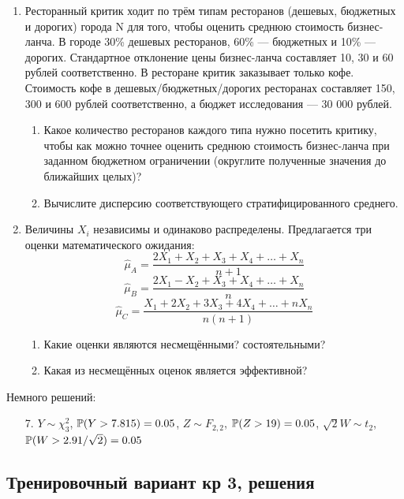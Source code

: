 \documentclass[12pt, a4paper]{article}\usepackage[]{graphicx}\usepackage[]{color}
\begin{document}
\begin{enumerate}
							\item Ресторанный критик ходит по трём типам ресторанов (дешевых, бюджетных и дорогих) города N для того, чтобы оценить среднюю стоимость бизнес-ланча. В городе 30\% дешевых ресторанов, 60\% — бюджетных и 10\% — дорогих. Стандартное отклонение цены бизнес-ланча составляет 10, 30 и 60 рублей соответственно. В ресторане критик заказывает только кофе. Стоимость кофе в дешевых/бюджетных/дорогих ресторанах составляет 150, 300 и 600 рублей соответственно, а бюджет исследования — 30 000 рублей.
							\begin{enumerate}
								\item Какое количество ресторанов каждого типа нужно посетить критику, чтобы как можно точнее оценить среднюю стоимость бизнес-ланча при заданном бюджетном ограничении (округлите полученные значения до ближайших целых)?
								\item  Вычислите дисперсию соответствующего стратифицированного среднего.
							\end{enumerate}



							\item Величины $X_i$ независимы и одинаково распределены. Предлагается три оценки математического ожидания:
							\[
							\hat \mu_A = \frac{2X_1 + X_2 + X_3 + X_4 +\ldots + X_n}{n+1}
							\]
							\[
							\hat \mu_B = \frac{2X_1 - X_2 + X_3 + X_4 + \ldots + X_n}{n}
							\]
							\[
							\hat \mu_C = \frac{X_1 + 2X_2 + 3X_3 + 4X_4 + \ldots + nX_n}{n(n+1)}
							\]

							\begin{enumerate}
								\item Какие оценки являются несмещёнными? состоятельными?
								\item Какая из несмещённых оценок является эффективной?
							\end{enumerate}
						\end{enumerate}

						Немного решений:

						\begin{enumerate}
							\item[7.] $Y \sim \chi^2_3$, $\P(Y>7.815)=0.05$, $Z \sim F_{2,2}$, $\P(Z>19)=0.05$, $\sqrt{2}W \sim t_{2}$, $\P(W > 2.91/\sqrt{2})=0.05$
						\end{enumerate}


						\subsection{Тренировочный вариант кр 3, решения}
\end{document}
